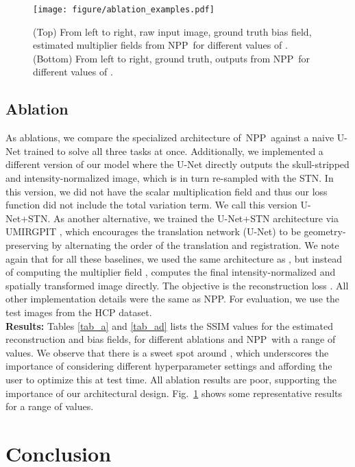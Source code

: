 \documentclass[runningheads]{llncs}
\newcommand{\modelname}{NPP}
\begin{document}
\begin{figure}[t]
\centering
\texttt{[image: figure/ablation\_examples.pdf]}
\caption{(Top) From left to right, raw input image, ground truth bias field, estimated multiplier fields from \modelname~for different values of . (Bottom) From left to right, ground truth, outputs from \modelname~for different values of .} \label{fig_a}
\end{figure}

\subsection{Ablation}
As ablations, we compare the specialized architecture of~\modelname~against a naive U-Net trained to solve all three tasks at once. 
Additionally, we implemented a different version of our model where the U-Net directly outputs the skull-stripped and intensity-normalized image, which is in turn re-sampled with the STN. In this version, we did not have the scalar multiplication field and thus our loss function did not include the total variation term. 
We call this version U-Net+STN.
As another alternative, we trained the U-Net+STN architecture via UMIRGPIT \cite{arar2020unsupervised}, which encourages the translation network (U-Net) to be geometry-preserving by alternating the order of the translation and registration. 
We note again that for all these baselines, we used the same architecture as , but instead of computing the multiplier field ,  computes the final intensity-normalized and spatially transformed image directly.
The objective is the reconstruction loss . 
All other implementation details were the same as \modelname.
For evaluation, we use the test images from the HCP dataset.\\

\noindent
\textbf{Results:}
Tables \ref{tab_a} and \ref{tab_ad} lists the SSIM values for the estimated reconstruction and bias fields, for different ablations and \modelname~with a range of  values.
We observe that there is a sweet spot around , which underscores the importance of considering different hyperparameter settings and affording the user to optimize this at test time.
All ablation results are poor, supporting the importance of our architectural design.
Fig.~\ref{fig_a} shows some representative results for a range of  values.

\section{Conclusion}
\end{document}
